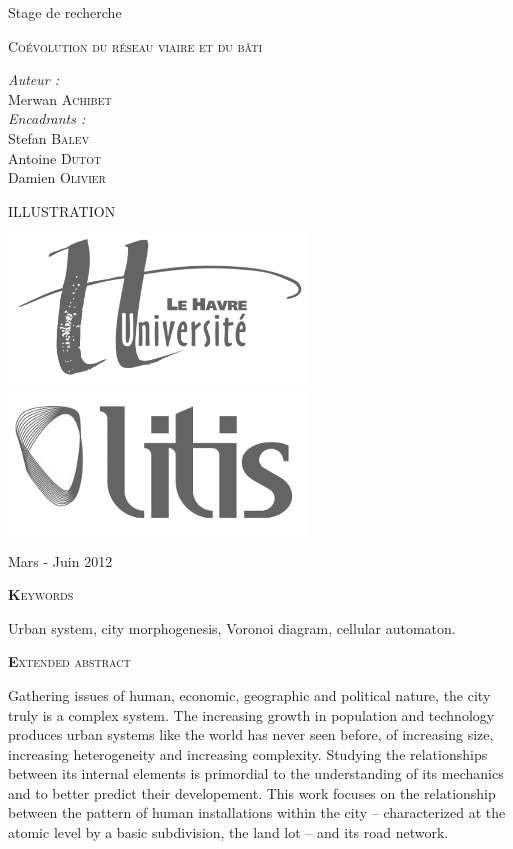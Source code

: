 \documentclass[12pt]{article}
\begin{document}
\begin{titlepage}

  Stage de recherche

  {\Large \textsc{Coévolution du réseau viaire et du bâti}}

  \begin{flushright}
    \textit{Auteur :}\\
    Merwan {\scshape Achibet}\\[0.5cm]
    \textit{Encadrants :}\\
    Stefan {\scshape Balev}\\
    Antoine {\scshape Dutot}\\
    Damien {\scshape Olivier}
  \end{flushright}

  \vfill

  \begin{center}
    ILLUSTRATION
  \end{center}

  \vfill

  \begin{center}
    \includegraphics[width=.25\linewidth]{images/logo-univ-le-havre.png}
    \qquad\qquad\qquad
    \includegraphics[width=.25\linewidth]{images/logo-litis.png}
  \end{center}

  \begin{center}
    {\small Mars - Juin 2012}
  \end{center}

\end{titlepage}

\begin{center}
  {\scshape\textbf Keywords}
\end{center}

{Urban system, city morphogenesis, Voronoi diagram, cellular automaton.}

\begin{center}
  {\scshape\textbf Extended abstract}
\end{center}

Gathering issues of human, economic, geographic and political nature,
the city truly is a complex system. The increasing growth in
population and technology produces urban systems like the world has
never seen before, of increasing size, increasing heterogeneity and
increasing complexity. Studying the relationships between its internal
elements is primordial to the understanding of its mechanics and to
better predict their developement. This work focuses on the
relationship between the pattern of human installations within the
city -- characterized at the atomic level by a basic subdivision, the
land lot -- and its road network.
\end{document}
